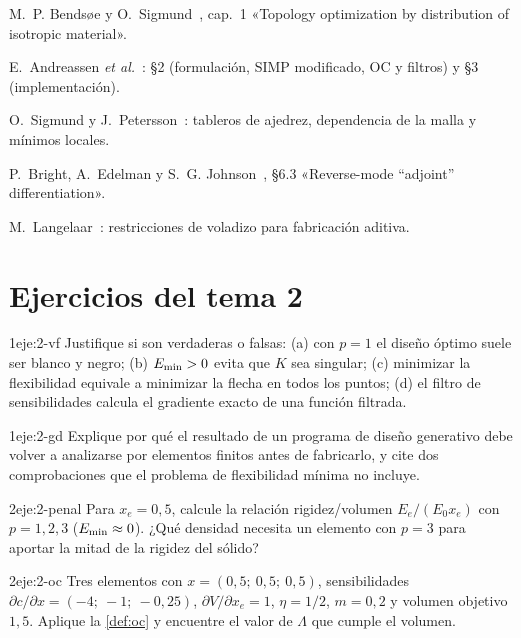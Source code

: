 \begin{lecturas}
\item M.~P. Bendsøe y O.~Sigmund~\cite{bs}, cap.~1 «Topology optimization by distribution of isotropic material».
\item E.~Andreassen \emph{et al.}~\cite{andreassen}: §2 (formulación, SIMP modificado, OC y filtros) y §3 (implementación).
\item O.~Sigmund y J.~Petersson~\cite{sigpet}: tableros de ajedrez, dependencia de la malla y mínimos locales.
\item P.~Bright, A.~Edelman y S.~G. Johnson~\cite{mit18s096}, §6.3 «Reverse-mode “adjoint” differentiation».
\item M.~Langelaar~\cite{langelaar}: restricciones de voladizo para fabricación aditiva.
\end{lecturas}

\section*{Ejercicios del tema 2}

\begin{ejercicio}{1}{eje:2-vf}
Justifique si son verdaderas o falsas: (a) con $p=1$ el diseño óptimo suele ser blanco y negro; (b) $E_{\min}>0$ evita que $K$ sea singular; (c) minimizar la flexibilidad equivale a minimizar la flecha en todos los puntos; (d) el filtro de sensibilidades calcula el gradiente exacto de una función filtrada.
\end{ejercicio}

\begin{ejercicio}{1}{eje:2-gd}
Explique por qué el resultado de un programa de diseño generativo debe volver a analizarse por elementos finitos antes de fabricarlo, y cite dos comprobaciones que el problema de flexibilidad mínima no incluye.
\end{ejercicio}

\begin{ejercicio}{2}{eje:2-penal}
Para $x_e=0{,}5$, calcule la relación rigidez/volumen $E_e/(E_0x_e)$ con $p=1,2,3$ ($E_{\min}\approx 0$). ¿Qué densidad necesita un elemento con $p=3$ para aportar la mitad de la rigidez del sólido?
\end{ejercicio}

\begin{ejercicio}{2}{eje:2-oc}
Tres elementos con $x=(0{,}5;\ 0{,}5;\ 0{,}5)$, sensibilidades $\partial c/\partial x=(-4;\ -1;\ -0{,}25)$, $\partial V/\partial x_e=1$, $\eta=1/2$, $m=0{,}2$ y volumen objetivo $1{,}5$. Aplique la \cref{def:oc} y encuentre el valor de $\Lambda$ que cumple el volumen.
\end{ejercicio}

